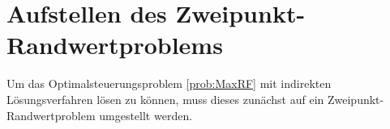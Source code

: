%
%
%

















\section{Aufstellen des Zweipunkt-Randwertproblems}
Um das Optimalsteuerungsproblem \ref{prob:MaxRF} mit indirekten Lösungsverfahren lösen zu können, muss dieses zunächst auf ein Zweipunkt-Randwertproblem umgestellt werden.

